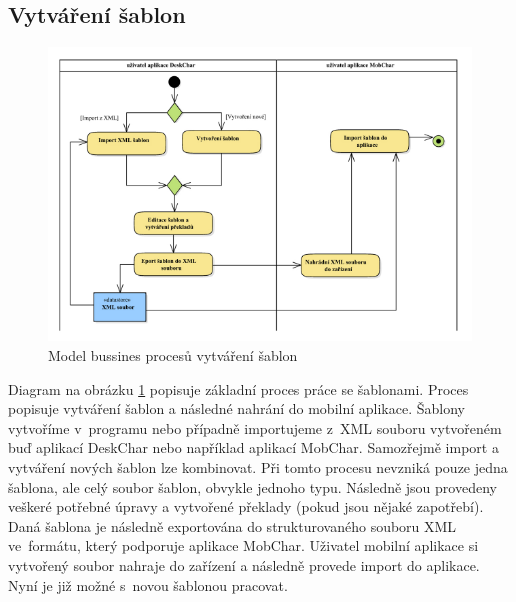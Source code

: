 \documentclass[thesis=B,czech]{resources/FITthesis}[2012/06/26]
\begin{document}
\subsection{Vytváření šablon} \label{sec:vytvareni_sablon}
\begin{figure}\centering
	\includegraphics[width=1\textwidth]{images/bussiness_sablony}
	\caption[Business proces vytváření šablon]{Model bussines procesů vytváření šablon}\label{fig:bp_sablony}
\end{figure}
Diagram na obrázku \ref{fig:bp_sablony} popisuje základní proces práce se šablonami. Proces popisuje vytváření šablon a následné nahrání do mobilní aplikace. Šablony vytvoříme v~programu nebo případně importujeme z~XML souboru vytvořeném buď aplikací DeskChar nebo například aplikací MobChar. Samozřejmě import a vytváření nových šablon lze kombinovat. Při tomto procesu nevzniká pouze jedna šablona, ale celý soubor šablon, obvykle jednoho typu. Následně jsou provedeny veškeré potřebné úpravy a vytvořené překlady (pokud jsou nějaké zapotřebí). Daná šablona je následně exportována do strukturovaného souboru XML ve~formátu, který podporuje aplikace MobChar. Uživatel mobilní aplikace si vytvořený soubor nahraje do zařízení a následně provede import do aplikace. Nyní je již možné s~novou šablonou pracovat.
\end{document}
